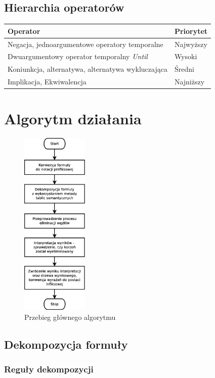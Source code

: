 \documentclass[12pt,a4paper,titlepage]{article}
\begin{document}
\subsection{Hierarchia operatorów}
\begin{tabular}{|C{5cm}|C{5cm}|}
  \hline
  \textbf{Operator} & \textbf{Priorytet}\\
  \hline
  Negacja, jednoargumentowe operatory temporalne & Najwyższy\\
  \hline
  Dwuargumentowy operator temporalny \textit{Until} & Wysoki\\ 
  \hline
  Koniunkcja, alternatywa, alternatywa wykluczająca & Średni\\
  \hline
  Implikacja, Ekwiwalencja & Najniższy\\
  \hline
\end{tabular}

\section{Algorytm działania}

\begin{figure}[!htb]
\centering
\includegraphics[height=9cm]{main_alg}
\caption{Przebieg głównego algorytmu}
\end{figure}

\subsection{Dekompozycja formuły}

\subsubsection{Reguły dekompozycji}
\label{dekompozycja}
\end{document}
